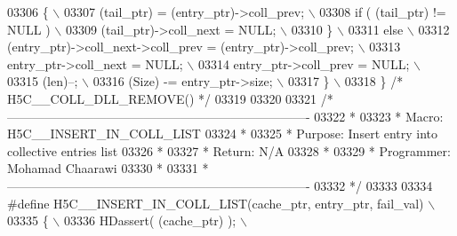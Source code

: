 \begin{DoxyCode}
03306 \textcolor{preprocessor}{       \{                                                                     \(\backslash\)}
03307 \textcolor{preprocessor}{          (tail\_ptr) = (entry\_ptr)->coll\_prev;                               \(\backslash\)}
03308 \textcolor{preprocessor}{          if ( (tail\_ptr) != NULL )                                          \(\backslash\)}
03309 \textcolor{preprocessor}{             (tail\_ptr)->coll\_next = NULL;                                   \(\backslash\)}
03310 \textcolor{preprocessor}{       \}                                                                     \(\backslash\)}
03311 \textcolor{preprocessor}{       else                                                                  \(\backslash\)}
03312 \textcolor{preprocessor}{          (entry\_ptr)->coll\_next->coll\_prev = (entry\_ptr)->coll\_prev;        \(\backslash\)}
03313 \textcolor{preprocessor}{       entry\_ptr->coll\_next = NULL;                                          \(\backslash\)}
03314 \textcolor{preprocessor}{       entry\_ptr->coll\_prev = NULL;                                          \(\backslash\)}
03315 \textcolor{preprocessor}{       (len)--;                                                              \(\backslash\)}
03316 \textcolor{preprocessor}{       (Size) -= entry\_ptr->size;                                            \(\backslash\)}
03317 \textcolor{preprocessor}{    \}                                                                        \(\backslash\)}
03318 \textcolor{preprocessor}{\} }\textcolor{comment}{/* H5C\_\_COLL\_DLL\_REMOVE() */}\textcolor{preprocessor}{}
03319 
03320 
03321 \textcolor{comment}{/*-------------------------------------------------------------------------}
03322 \textcolor{comment}{ *}
03323 \textcolor{comment}{ * Macro:   H5C\_\_INSERT\_IN\_COLL\_LIST}
03324 \textcolor{comment}{ *}
03325 \textcolor{comment}{ * Purpose:     Insert entry into collective entries list}
03326 \textcolor{comment}{ *}
03327 \textcolor{comment}{ * Return:      N/A}
03328 \textcolor{comment}{ *}
03329 \textcolor{comment}{ * Programmer:  Mohamad Chaarawi}
03330 \textcolor{comment}{ *}
03331 \textcolor{comment}{ *-------------------------------------------------------------------------}
03332 \textcolor{comment}{ */}
03333 
03334 \textcolor{preprocessor}{#define H5C\_\_INSERT\_IN\_COLL\_LIST(cache\_ptr, entry\_ptr, fail\_val)        \(\backslash\)}
03335 \textcolor{preprocessor}{\{                                                                       \(\backslash\)}
03336 \textcolor{preprocessor}{    HDassert( (cache\_ptr) );                                            \(\backslash\)}

\end{DoxyCode}
